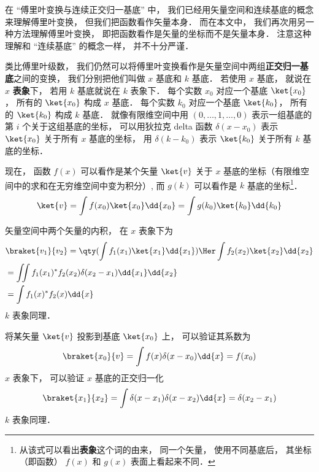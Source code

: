 

在 “傅里叶变换与连续正交归一基底” 中， 我们已经用矢量空间和连续基底的概念来理解傅里叶变换， 但我们把函数看作矢量本身． 而在本文中， 我们再次用另一种方法理解傅里叶变换， 即把函数看作是矢量的坐标而不是矢量本身． 注意这种理解和 “连续基底” 的概念一样， 并不十分严谨．

类比傅里叶级数， 我们仍然可以将傅里叶变换看作是矢量空间中两组\textbf{正交归一基底}之间的变换， 我们分别把他们叫做 $x$ 基底和 $k$ 基底． 若使用 $x$ 基底， 就说在 $x$ \textbf{表象}下， 若用 $k$ 基底就说在 $k$ 表象下． 每个实数 $x_0$ 对应一个基底 $\ket {x_0}$， 所有的 $\ket{x_0}$ 构成 $x$ 基底． 每个实数 $k_0$ 对应一个基底 $\ket {k_0}$， 所有的 $\ket {k_0}$ 构成 $k$ 基底． 就像有限维空间中用 $(0, \dots , 1, \dots , 0)$ 表示一组基底的第 $i$ 个关于这组基底的坐标， 可以用狄拉克 delta 函数 $\delta (x - x_0)$ 表示 $\ket {x_0}$ 关于所有 $x$ 基底的坐标， 用 $\delta (k - k_0)$ 表示 $\ket {k_0}$ 关于所有 $k$ 基底的坐标．

现在， 函数 $f(x)$ 可以看作是某个矢量 $\ket{v}$ 关于 $x$ 基底的坐标（有限维空间中的求和在无穷维空间中变为积分）, 而 $g(k)$ 可以看作是 $k$ 基底的坐标\footnote{从该式可以看出\textbf{表象}这个词的由来， 同一个矢量， 使用不同基底后， 其坐标（即函数） $f(x)$ 和 $g(x)$ 表面上看起来不同．}．
\begin{equation}
\ket{v} = \int f(x_0) \ket {x_0} \dd{x_0} = \int g(k_0) \ket {k_0} \dd{k_0}
\end{equation}

矢量空间中两个矢量的内积， 在 $x$ 表象下为
\begin{equation}
\begin{aligned}
&\braket{v_1}{v_2} = \qty(\int f_1(x_1) \ket{x_1} \dd{x_1})\Her  \int f_2(x_2) \ket{x_2} \dd{x_2}\\
&=\iint f_1(x_1)^* f_2(x_2) \delta (x_2 - x_1) \dd{x_1}\dd{x_2}\\
&=\int f_1(x)^* f_2(x) \dd{x}
\end{aligned}
\end{equation}
$k$ 表象同理．

将某矢量 $\ket{v}$ 投影到基底 $\ket{x_0}$ 上， 可以验证其系数为
\begin{equation}
\braket{x_0}{v} = \int f(x) \delta (x - x_0) \dd{x} = f(x_0)
\end{equation}
$x$ 表象下， 可以验证 $x$ 基底的正交归一化%
\begin{equation}
\braket{x_1}{x_2} = \int \delta (x - x_1) \delta (x - x_2) \dd{x} = \delta (x_2 - x_1)
\end{equation}
$k$ 表象同理．

